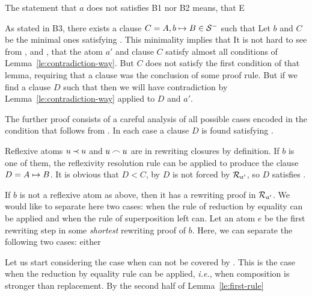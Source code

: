 \begin{PROOF}
The statement that $a$ does not satisfies B1 nor B2 means, that 
\newITEM E

As stated in B3, there exists a clause \(C= A,b\mathrel{\mapsto} B\in{\cal S}^{-}\) such
that
Let $b$ and $C$ be the minimal ones satisfying . 
This minimality implies that 
It is not hard to see from ,  and , that the atom $a'$ and clause
$C$ satisfy almost all conditions of Lemma~\ref {le:contradiction-way}. But
$C$ does not satisfy the first condition of that lemma, requiring that a
clause was the conclusion of some proof rule. But if we find a clause $D$
such that 
then we will have contradiction by Lemma~\ref {le:contradiction-way} applied to 
$D$ and $a'$.

The further proof consists of a careful analysis of all possible
cases encoded in the condition
that follows from . In each case a clause $D$ is found satisfying .

Reflexive atoms \(u\mathbin{\prec} u\) and \(u\mathbin{\frown} u\) are in rewriting closures by
definition. If $b$ is one of them, the reflexivity resolution rule can be
applied to produce the clause \(D = A\mathrel{\mapsto} B\). It is
obvious that \(D<C\), by  $D$ is not forced by \(\mbox{$\cal R$}_{a'}\), so $D$
satisfies . 

If $b$ is not a reflexive atom as above, then it has a rewriting proof in \(\mbox{$\cal R$}_{a'}\). We would like to separate here two cases: when the rule of reduction
by equality can be applied and when the rule of superposition left can. Let an
atom $e$ be the first rewriting step in some {\em shortest} rewriting proof of
$b$. Here, we can separate the following two cases: either

Let us start considering the case when  can not be covered by . 
This is the case
when the reduction by equality rule can be applied, {\em i.e.}, when
composition is stronger than replacement. 
By the second half of Lemma~\ref {le:first-rule}


\end{PROOF}
